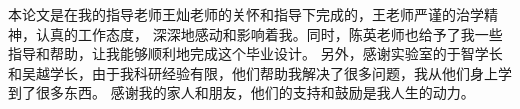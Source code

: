 
\begin{thanks}

    本论文是在我的指导老师王灿老师的关怀和指导下完成的，王老师严谨的治学精神，认真的工作态度，
    深深地感动和影响着我。同时，陈英老师也给予了我一些指导和帮助，让我能够顺利地完成这个毕业设计。
    另外，感谢实验室的于智学长和吴越学长，由于我科研经验有限，他们帮助我解决了很多问题，我从他们身上学到了很多东西。
    感谢我的家人和朋友，他们的支持和鼓励是我人生的动力。

\end{thanks}
